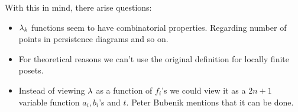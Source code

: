 \documentclass[12pt]{memoir}
\begin{document}
With this in mind, there arise questions:
\begin{itemize}
    \item $\lambda_k$ functions seem to have combinatorial properties. Regarding number of points in persistence diagrams and so on.
    \item For theoretical reasons we can't use the original definition for locally finite posets.
    \item Instead of viewing $\lambda$ as a function of $f_i$'s we could view it as a $2n+1$ variable function $a_i,b_i$'s and $t$. Peter Bubenik mentions that it can be done. 
\end{itemize}

\ifx\nextra\undefined
\printindex
\else\fi
\nocite{*}


\end{document}

